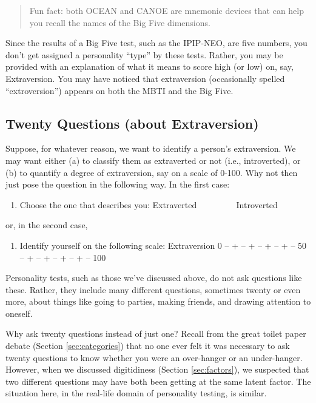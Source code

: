\documentclass[]{book}
\providecommand{\tightlist}{%
  \setlength{\itemsep}{0pt}\setlength{\parskip}{0pt}}
\begin{document}
\begin{quote}
Fun fact: both OCEAN and CANOE are mnemonic devices that can help you recall the names of the Big Five dimensions.
\end{quote}

Since the results of a Big Five test, such as the IPIP-NEO, are five numbers, you don't get assigned a personality ``type'' by these tests. Rather, you may be provided with an explanation of what it means to score high (or low) on, say, Extraversion. You may have noticed that extraversion (occasionally spelled ``extroversion'') appears on both the MBTI and the Big Five.

\hypertarget{twenty-questions-about-extraversion}{%
\subsection{Twenty Questions (about Extraversion)}\label{twenty-questions-about-extraversion}}

Suppose, for whatever reason, we want to identify a person's extraversion. We may want either (a) to classify them as extraverted or not (i.e., introverted), or (b) to quantify a degree of extraversion, say on a scale of 0-100. Why not then just pose the question in the following way. In the first case:

\begin{enumerate}
\def\labelenumi{\alph{enumi})}
\tightlist
\item
  Choose the one that describes you: Extraverted ~~~~\textbar{} ~~~~Introverted
\end{enumerate}

or, in the second case,

\begin{enumerate}
\def\labelenumi{\alph{enumi})}
\setcounter{enumi}{1}
\tightlist
\item
  Identify yourself on the following scale: Extraversion 0 -- + -- + -- + -- + -- 50 -- + -- + -- + -- + -- 100
\end{enumerate}

Personality tests, such as those we've discussed above, do not ask questions like these. Rather, they include many different questions, sometimes twenty or even more, about things like going to parties, making friends, and drawing attention to oneself.

Why ask twenty questions instead of just one? Recall from the great toilet paper debate (Section \ref{sec:categories}) that no one ever felt it was necessary to ask twenty questions to know whether you were an over-hanger or an under-hanger. However, when we discussed digitidiness (Section \ref{sec:factors}), we suspected that two different questions may have both been getting at the same latent factor. The situation here, in the real-life domain of personality testing, is similar.
\end{document}
